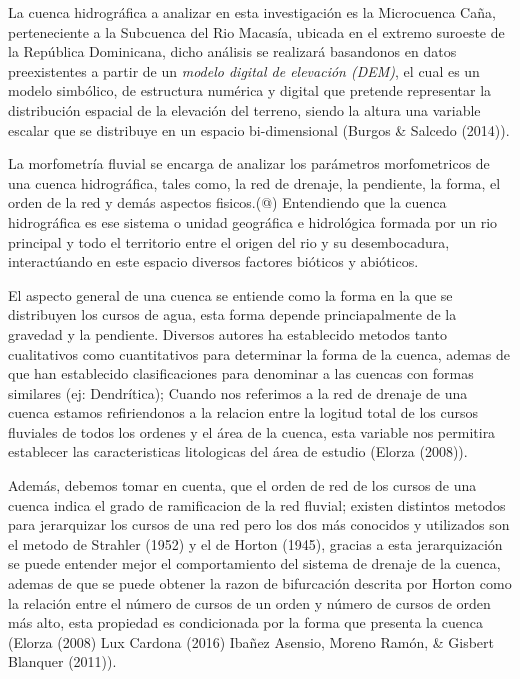 \documentclass[11pt,]{article}
\begin{document}
La cuenca hidrográfica a analizar en esta investigación es la
Microcuenca Caña, perteneciente a la Subcuenca del Rio Macasía, ubicada
en el extremo suroeste de la República Dominicana, dicho análisis se
realizará basandonos en datos preexistentes a partir de un \emph{modelo
digital de elevación (DEM)}, el cual es un modelo simbólico, de
estructura numérica y digital que pretende representar la distribución
espacial de la elevación del terreno, siendo la altura una variable
escalar que se distribuye en un espacio bi-dimensional (Burgos \&
Salcedo (2014)).

La morfometría fluvial se encarga de analizar los parámetros
morfometricos de una cuenca hidrográfica, tales como, la red de drenaje,
la pendiente, la forma, el orden de la red y demás aspectos fisicos.(@)
Entendiendo que la cuenca hidrográfica es ese sistema o unidad
geográfica e hidrológica formada por un rio principal y todo el
territorio entre el origen del rio y su desembocadura, interactúando en
este espacio diversos factores bióticos y abióticos.

El aspecto general de una cuenca se entiende como la forma en la que se
distribuyen los cursos de agua, esta forma depende princiapalmente de la
gravedad y la pendiente. Diversos autores ha establecido metodos tanto
cualitativos como cuantitativos para determinar la forma de la cuenca,
ademas de que han establecido clasificaciones para denominar a las
cuencas con formas similares (ej: Dendrítica); Cuando nos referimos a la
red de drenaje de una cuenca estamos refiriendonos a la relacion entre
la logitud total de los cursos fluviales de todos los ordenes y el área
de la cuenca, esta variable nos permitira establecer las caracteristicas
litologicas del área de estudio (Elorza (2008)).

Además, debemos tomar en cuenta, que el orden de red de los cursos de
una cuenca indica el grado de ramificacion de la red fluvial; existen
distintos metodos para jerarquizar los cursos de una red pero los dos
más conocidos y utilizados son el metodo de Strahler (1952) y el de
Horton (1945), gracias a esta jerarquización se puede entender mejor el
comportamiento del sistema de drenaje de la cuenca, ademas de que se
puede obtener la razon de bifurcación descrita por Horton como la
relación entre el número de cursos de un orden y número de cursos de
orden más alto, esta propiedad es condicionada por la forma que presenta
la cuenca (Elorza (2008) Lux Cardona (2016) Ibañez Asensio, Moreno
Ramón, \& Gisbert Blanquer (2011)).
\end{document}

